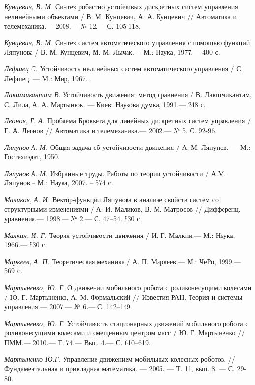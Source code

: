 \begin{thebibliography}{10}
	{\it Кунцевич, В. М.} Синтез робастно устойчивых дискретных систем управления нелинейными объектами
	/ В. М. Кунцевич, А. А. Кунцевич // Автоматика и телемеханика.— 2008.— № 12.— С. 105-118.
	
	{\it Кунцевич, В. М.} Синтез систем автоматического управления с помощью функций
	Ляпунова / В. М. Кунцевич, М. М. Лычак.— М.: Наука, 1977.— 400 с.
	
	{\it Лефшец С.} Устойчивость нелинейных систем автоматического управления /
	С. Лефшец. — М.: Мир, 1967.
	
	{\it Лакшмикантам В.} Устойчивость движения: метод сравнения / В. Лакшмикантам, С. Лила, А. А. Мартынюк. — Киев: Наукова думка, 1991.— 248 с.
	
	{\it Леонов, Г. А.} Проблема Броккета для линейных дискретных систем управления / Г. А. Леонов // Автоматика и телемеханика.—  2002.— № 5. С. 92-96.
	
	{\it Ляпунов А. М.} Общая задача об устойчивости движения / А. М. Ляпунов. — М.: Гостехиздат, 1950.
	
	{\it Ляпунов А. М.} Избранные труды. Работы по теории устойчивости / А.М. Ляпунов – М.: Наука, 2007. – 574 с.
	
	{\it Маликов, А. И.} Вектор-функции Ляпунова в анализе свойств систем со структурными изменениями / А. И. Маликов, В. М. Матросов // Дифференц. уравнения.— 1998.— № 2.— С. 47–54.
	530 с.
	
	{\it Малкин, И. Г.} Теория устойчивости движения / И. Г. Малкин.— М.: Наука, 1966.—
	530 с.
	
	{\it Маркеев, А. П.} Теоретическая механика / А. П. Маркеев.— М.: ЧеРо, 1999.— 569 с.
	
	{\it Мартыненко, Ю. Г.} О движении мобильного робота с роликонесущими колесами / Ю. Г. Мартыненко, А. М. Формальский  //
	Известия РАН. Теория и системы управления.— 2007.— № 6.— С. 142–149.
	
	
	{\it Мартыненко, Ю. Г.} Устойчивость стационарных движений мобильного робота с роликонесущими колесами и смещенным центром масс / Ю. Г. Мартыненко //
	ПММ.— 2010.— Т. 74.— Вып. 4.— С. 610–619.
	
	{\it Мартыненко Ю.Г.} Управление движением мобильных колесных роботов. // Фундаментальная и прикладная математика. — 2005. — Т. 11, вып. 8. — С. 29-80.
	

\end{thebibliography}
